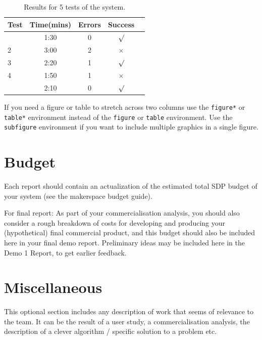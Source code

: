 \documentclass{article}
\begin{document}
\begin{table}[h]
\vskip 3mm
\begin{center}
\begin{small}
\begin{sc}
\begin{tabular}{lcccr}
\hline
\abovespace\belowspace
Test  & Time(mins) & Errors & Success \\
\hline
\abovespace
1    & 1:30 & 0 & $\surd$ \\
2    & 3:00 & 2 & $\times$\\
3    & 2:20 & 1 & $\surd$ \\
4    & 1:50 & 1 & $\times$\\
\belowspace
5    & 2:10 & 0 & $\surd$ \\
\hline
\end{tabular}
\end{sc}
\end{small}
\caption{Results for 5 tests of the system.}
\label{tab:sample-table}
\end{center}
\vskip -3mm
\end{table}

If you need a figure or table to stretch across two columns use the \verb+figure*+ or \verb+table*+ environment instead of the \verb+figure+ or \verb+table+ environment.  Use the \verb+subfigure+ environment if you want to include multiple graphics in a single figure.

\section{Budget}
Each report should contain an actualization of the estimated total SDP budget 
of your system (see the makerspace budget guide).  

For final report: As part of your commercialisation analysis, you should also consider a rough breakdown of costs for developing and producing your (hypothetical) final commercial product, and this budget should also be included here in your final demo report. Preliminary ideas may be included here in the Demo 1 Report, to get earlier feedback.

\section{Miscellaneous}
\label{sec:misc}
This optional section includes any description of work that seems of relevance to the team. It can be the result of a user study, a commercialisation analysis, the description of a clever algorithm / specific solution to a problem etc.
\end{document}
